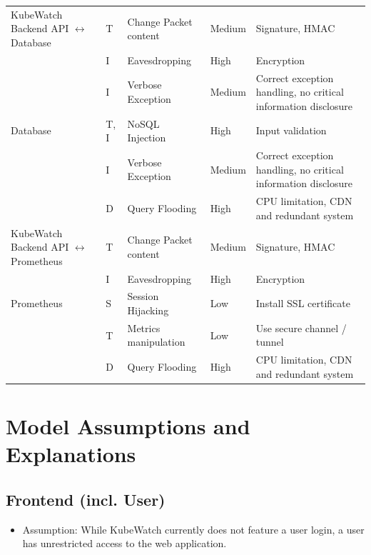 \begin{longtable}[h!]{p{2.1cm} p{1.8cm} p{3cm} p{2cm} p{3.5cm}}
    \hline
    KubeWatch Backend API \(\leftrightarrow\) Database
                        & T & Change Packet content & Medium & Signature, HMAC \\
                        & I & Eavesdropping & High & Encryption \\
                        & I & Verbose Exception & Medium & Correct exception handling, no critical information disclosure \\
    \hline
    Database            & T, I & NoSQL Injection & High & Input validation \\
                        & I & Verbose Exception & Medium & Correct exception handling, no critical information disclosure \\
                        & D & Query Flooding & High & CPU limitation, CDN and redundant system \\
    \hline
    KubeWatch Backend API \(\leftrightarrow\) Prometheus
                        & T & Change Packet content & Medium & Signature, HMAC \\
                        & I & Eavesdropping & High & Encryption \\
    \hline
    Prometheus          & S & Session Hijacking & Low & Install SSL certificate \\
                        & T & Metrics manipulation & Low & Use secure channel / tunnel \\
                        & D & Query Flooding & High & CPU limitation, CDN and redundant system \\
    \hline
\end{longtable}


\section{Model Assumptions and Explanations}

\subsection{Frontend (incl. User)}
\begin{itemize}
    \item Assumption: While KubeWatch currently does not feature a user login, a user has unrestricted access to the web application.
\end{itemize}


